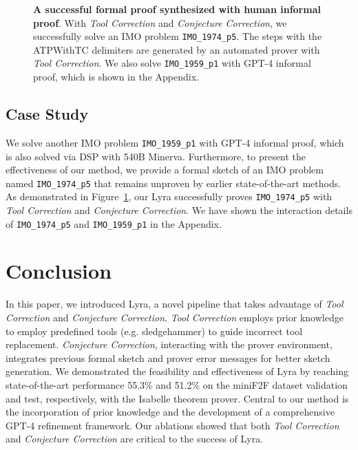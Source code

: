 \documentclass{article} \usepackage{iclr2024_conference,times}
\def\methodOneFull{\textit{Tool Correction}\xspace}
\def\methodTwoFull{\textit{Conjecture Correction}\xspace}
\def\fullname{Lyra\xspace}
\def\shortname{Lyra\xspace}
\begin{document}
\begin{figure}[t]
\begin{tcolorbox}[colback=mybrown!5!white,colframe=mybrown!75!black]
\begin{tiny}
\begin{lstlisting}[style=isabelle]
\end{lstlisting}
\end{tiny}
\end{tcolorbox}
\caption{
\small
\textbf{A successful formal proof synthesized with human informal proof}. With \methodOneFull and \methodTwoFull, we successfully solve an IMO problem \texttt{IMO\_1974\_p5}. The steps with the \textcolor{patriarch}{ATPWithTC} delimiters are generated by an automated prover with \methodOneFull. We also solve \texttt{IMO\_1959\_p1} with GPT-4 informal proof, which is shown in the Appendix. 
}
\vspace{-20pt}
\label{fig:case_study}
\end{figure}

\subsection{Case Study}

We solve another IMO problem \texttt{IMO\_1959\_p1} with GPT-4 informal proof, which is also solved via DSP with 540B Minerva. Furthermore, to present the effectiveness of our method, we provide a formal sketch of an IMO problem named \texttt{IMO\_1974\_p5} that remains unproven by earlier state-of-the-art methods. As demonstrated in Figure~\ref{fig:case_study}, our \shortname successfully proves \texttt{IMO\_1974\_p5} with \methodOneFull and \methodTwoFull. We have shown the interaction details of \texttt{IMO\_1974\_p5} and \texttt{IMO\_1959\_p1} in the Appendix. 

\section{Conclusion}
In this paper, we introduced \fullname, a novel pipeline that takes advantage of \methodOneFull and \methodTwoFull. \methodOneFull employs prior knowledge to employ predefined tools (e.g. sledgehammer) to guide incorrect tool replacement. \methodTwoFull, interacting with the prover environment, integrates previous formal sketch and prover error messages for better sketch generation.  We demonstrated the feasibility and effectiveness of \shortname by reaching state-of-the-art performance 55.3\% and 51.2\% on the miniF2F dataset validation and test, respectively, with the Isabelle theorem prover. Central to our method is the incorporation of prior knowledge and the development of a comprehensive GPT-4 refinement framework. Our ablations showed that both \methodOneFull and \methodTwoFull are critical to the success of \shortname.
\end{document}
